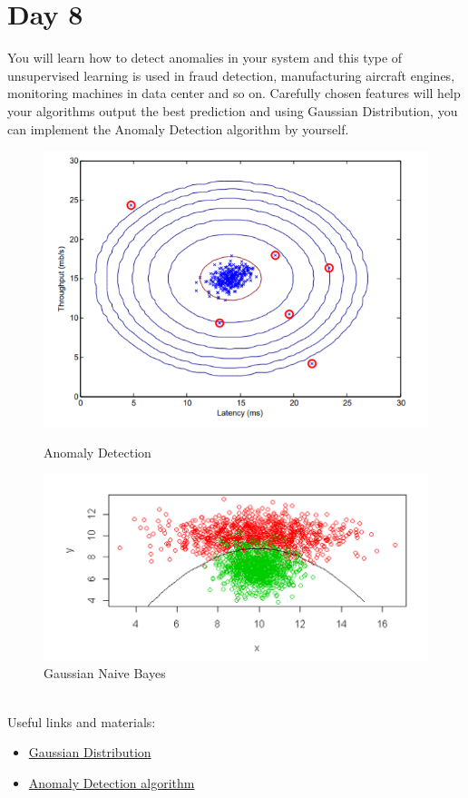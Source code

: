 \documentclass[11pt]{article}
\begin{document}
\section{Day 8}
You will learn how to detect anomalies in your system and this type of unsupervised learning is used in fraud detection, manufacturing aircraft engines, monitoring machines in data center and so on. Carefully chosen features will help your algorithms output the best prediction and using Gaussian Distribution, you can implement the Anomaly Detection algorithm by yourself.
\begin{figure}[h!]
\centering
\includegraphics[scale=.8]{img/ad.png}
{\caption*{Anomaly Detection}}
\centering
\hspace*{-1.1cm}   
\includegraphics[scale=.6]{img/gnb.png}
{\caption*{Gaussian Naive Bayes}}
\end{figure}\\
Useful links and materials:
\begin{itemize}
\item \href{https://www.youtube.com/watch?v=mh6rAYA0e7Q}{Gaussian Distribution}
\item \href{https://www.youtube.com/watch?v=g2YBWQnqOpw}{Anomaly Detection algorithm}
\end{itemize}
\pagebreak
\end{document}

